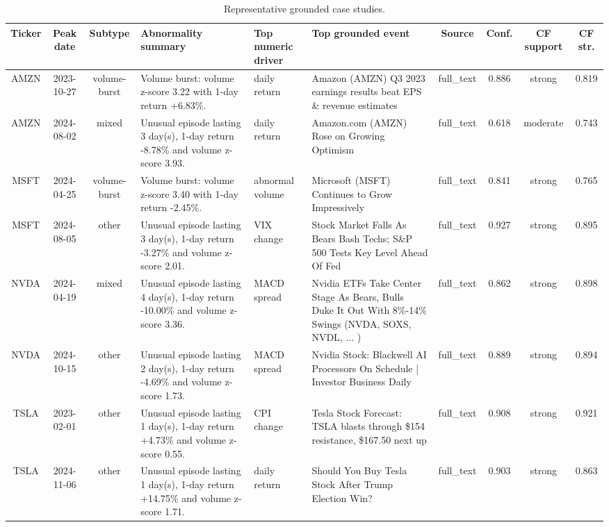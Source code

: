 \documentclass[11pt,a4paper,twoside]{article}
\begin{document}
\begin{table}[H]
    \centering
    \scriptsize
    \setlength{\tabcolsep}{2.5pt}
    \renewcommand{\arraystretch}{1.1}
    \begin{adjustbox}{max width=\linewidth}
    \begin{tabular}{c c c p{3.0cm} p{1.8cm} p{5.0cm} c c c c}
    \toprule
    \textbf{Ticker} & \textbf{Peak date} & \textbf{Subtype} & \textbf{Abnormality summary} & \textbf{Top numeric driver} & \textbf{Top grounded event} & \textbf{Source} & \textbf{Conf.} & \textbf{CF support} & \textbf{CF str.} \\
    \midrule
    AMZN & 2023-10-27 & volume-burst & Volume burst: volume z-score 3.22 with 1-day return +6.83\%. & daily return & Amazon (AMZN) Q3 2023 earnings results beat EPS \& revenue estimates & full\_text & 0.886 & strong & 0.819 \\
    AMZN & 2024-08-02 & mixed & Unusual episode lasting 3 day(s), 1-day return -8.78\% and volume z-score 3.93. & daily return & Amazon.com (AMZN) Rose on Growing Optimism & full\_text & 0.618 & moderate & 0.743 \\
    MSFT & 2024-04-25 & volume-burst & Volume burst: volume z-score 3.40 with 1-day return -2.45\%. & abnormal volume & Microsoft (MSFT) Continues to Grow Impressively & full\_text & 0.841 & strong & 0.765 \\
    MSFT & 2024-08-05 & other & Unusual episode lasting 3 day(s), 1-day return -3.27\% and volume z-score 2.01. & VIX change & Stock Market Falls As Bears Bash Techs; S\&P 500 Tests Key Level Ahead Of Fed & full\_text & 0.927 & strong & 0.895 \\
    NVDA & 2024-04-19 & mixed & Unusual episode lasting 4 day(s), 1-day return -10.00\% and volume z-score 3.36. & MACD spread & Nvidia ETFs Take Center Stage As Bears, Bulls Duke It Out With 8\%-14\% Swings (NVDA, SOXS, NVDL, ... ) & full\_text & 0.862 & strong & 0.898 \\
    NVDA & 2024-10-15 & other & Unusual episode lasting 2 day(s), 1-day return -4.69\% and volume z-score 1.73. & MACD spread & Nvidia Stock: Blackwell AI Processors On Schedule | Investor Business Daily & full\_text & 0.889 & strong & 0.894 \\
    TSLA & 2023-02-01 & other & Unusual episode lasting 1 day(s), 1-day return +4.73\% and volume z-score 0.55. & CPI change & Tesla Stock Forecast: TSLA blasts through \$154 resistance, \$167.50 next up & full\_text & 0.908 & strong & 0.921 \\
    TSLA & 2024-11-06 & other & Unusual episode lasting 1 day(s), 1-day return +14.75\% and volume z-score 1.71. & daily return & Should You Buy Tesla Stock After Trump Election Win? & full\_text & 0.903 & strong & 0.863 \\
    \bottomrule
    \end{tabular}
    \end{adjustbox}
    \caption{Representative grounded case studies.}
    \label{tab:representative_grounded_case_studies}
\end{table}
\end{document}
